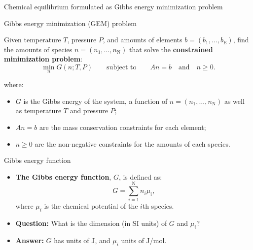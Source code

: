 %
\begin{frame}{Chemical equilibrium formulated as Gibbs energy minimization problem}
%
\begin{cbox}{Gibbs energy minimization (GEM) problem}

Given temperature $T$, pressure $P$, and amounts of elements ${b=(b_{1},\ldots,b_{\text{E}})}$,
find the amounts of species ${n=(n_{1},\ldots,n_{\text{N}})}$ that
solve the \textbf{constrained minimization problem}:
\[
\min_{n}G(n;T,P)\qquad\text{subject to}\qquad An=b\quad\text{and}\quad n\geq0.
\]

\end{cbox}where:

\begin{itemize}
\item $G$ is the Gibbs energy of the system, a function of $n=(n_{1},\ldots,n_{\text{N}})$
as well as temperature $T$ and pressure $P$;
\item $An=b$ are the mass conservation constraints for each element;
\item $n\geq0$ are the non-negative constraints for the amounts of each
species.
\end{itemize}
\end{frame}
%
\begin{frame}{Gibbs energy function}

\begin{itemize}
\item 
\textbf{The Gibbs energy function}, $G$, is defined as: 
\[
G=\sum_{i=1}^{\text{N}}n_{i}\mu_{i},
\]
where $\mu_{i}$ is the \alert{chemical potential} of the $i$th
species. \\[30pt]
\hiddenpause
\item \textbf{Question:} What is the dimension (in SI units) of $G$ and
$\mu_{i}$? 
\hiddenpause
\item \textbf{Answer:} $G$ has units of J, and $\mu_{i}$ units of J/mol.
\end{itemize}
\end{frame}
%
%
